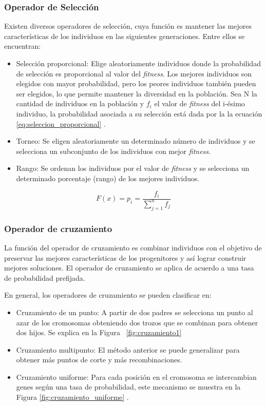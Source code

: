 \subsubsection{Operador de Selección}
Existen diversos operadores de selección, cuya función es mantener las mejores características de los individuos en las siguientes generaciones. Entre ellos se encuentran:
\begin{itemize}
	\item Selección proporcional: Elige aleatoriamente individuos donde la probabilidad de selección es proporcional al valor del \emph{fitness}. Los mejores individuos son elegidos con mayor probabilidad, pero los peores individuos también pueden ser elegidos, lo que permite mantener la diversidad en la población. Sea N la cantidad de individuos en la población y $f_i$ el valor de \emph{fitness} del i-ésimo individuo, la probabilidad asociada a su selección está dada por la la ecuación \ref{eq:seleccion_proporcional} .
	\item Torneo: Se eligen aleatoriamente un determinado número de individuos y se selecciona un subconjunto de los individuos con mejor \emph{fitness}.
	\item Rango: Se ordenan los individuos por el valor de \emph{fitness} y se selecciona un determinado porcentaje (rango) de los mejores individuos.
\end{itemize}

\begin{equation}
\label{eq:seleccion_proporcional}
F(x) =  p_i = \frac{f_i}{\sum_{j=1}^{n}{f_j}}  
\end{equation}
        
        
\subsubsection{Operador de cruzamiento}
La función del operador de cruzamiento es combinar individuos con el objetivo de preservar las mejores características de los progenitores y así lograr construir mejores soluciones. El operador de cruzamiento se aplica de acuerdo a una tasa de probabilidad prefijada. 


En general, los operadores de cruzamiento se pueden clasificar en:

\begin{itemize}
	\item Cruzamiento de un punto: A partir de dos padres se selecciona un punto al azar de los cromosomas obteniendo dos trozos que se combinan para obtener dos hijos. Se explica en la Figura ~\ref{fig:cruzamiento1}
	\item Cruzamiento multipunto: El método anterior se puede generalizar para obtener más puntos de corte y más recombinaciones.
	\item Cruzamiento uniforme: Para cada posición en el cromosoma se   intercambian genes según una tasa de probabilidad, este mecanismo se muestra en la Figura \ref{fig:cruzamiento_uniforme} .	
\end{itemize}

